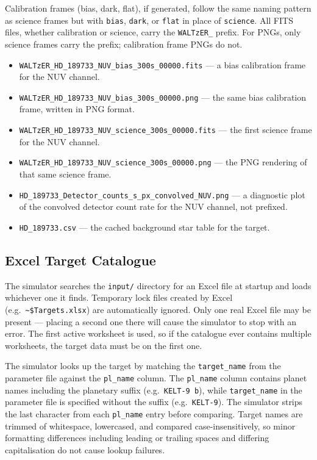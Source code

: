 Calibration frames (bias, dark, flat), if generated, follow the same naming pattern as science frames but with \texttt{bias}, \texttt{dark}, or \texttt{flat} in place of \texttt{science}. All FITS files, whether calibration or science, carry the \texttt{WALTzER\_} prefix. For PNGs, only science frames carry the prefix; calibration frame PNGs do not.

\begin{itemize}
    \item \texttt{WALTzER\_HD\_189733\_NUV\_bias\_300s\_00000.fits} --- a bias calibration frame for the NUV channel.
    \item \texttt{WALTzER\_HD\_189733\_NUV\_bias\_300s\_00000.png} --- the same bias calibration frame, written in PNG format.
    \item \texttt{WALTzER\_HD\_189733\_NUV\_science\_300s\_00000.fits} --- the first science frame for the NUV channel.
    \item \texttt{WALTzER\_HD\_189733\_NUV\_science\_300s\_00000.png} --- the PNG rendering of that same science frame.
    \item \texttt{HD\_189733\_Detector\_counts\_s\_px\_convolved\_NUV.png} --- a diagnostic plot of the convolved detector count rate for the NUV channel, not prefixed.
    \item \texttt{HD\_189733.csv} --- the cached background star table for the target.
\end{itemize}

\subsection{Excel Target Catalogue}
\label{sec:excel_catalogue}

The simulator searches the \texttt{input/} directory for an Excel file at startup and loads whichever one it finds. Temporary lock files created by Excel (e.g.\ \texttt{\textasciitilde\$Targets.xlsx}) are automatically ignored. Only one real Excel file may be present — placing a second one there will cause the simulator to stop with an error. The first active worksheet is used, so if the catalogue ever contains multiple worksheets, the target data must be on the first one.

The simulator looks up the target by matching the \texttt{target\_name} from the parameter file against the \texttt{pl\_name} column. The \texttt{pl\_name} column contains planet names including the planetary suffix (e.g.\ \texttt{KELT-9 b}), while \texttt{target\_name} in the parameter file is specified without the suffix (e.g.\ \texttt{KELT-9}). The simulator strips the last character from each \texttt{pl\_name} entry before comparing. Target names are trimmed of whitespace, lowercased, and compared case-insensitively, so minor formatting differences including leading or trailing spaces and differing capitalisation do not cause lookup failures.

